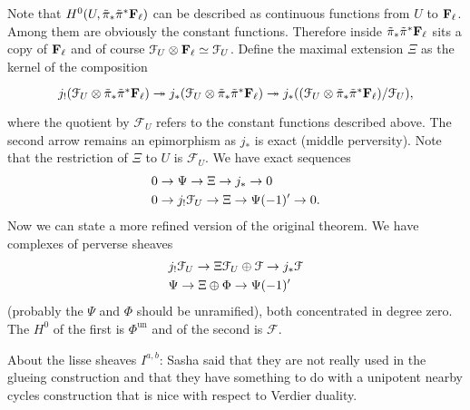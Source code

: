 \documentclass[deligne.tex]{subfiles}
\begin{document}
Note that $H^0(U,\tilde\pi_*\tilde\pi^*\mathbf{F}_\ell)$ can be described as
continuous functions from $U$ to $\mathbf{F}_\ell$. Among them are obviously the
constant functions. Therefore inside $\tilde\pi_*\tilde\pi^*\mathbf{F}_\ell$
sits a copy of $\mathbf{F}_\ell$ and of course
$\mathcal F_U\otimes\mathbf{F}_\ell\simeq\mathcal F_U$.
Define the maximal extension $\Xi$ as the kernel of the composition
\begin{equation*}\begin{tikzcd}
	j_!(\mathcal F_U\otimes\tilde\pi_*\tilde\pi^*\FF_\ell)\twoheadrightarrow
	j_*(\mathcal F_U\otimes\tilde\pi_*\tilde\pi^*\FF_\ell)\twoheadrightarrow
	j_*((\mathcal F_U\otimes\tilde\pi_*\tilde\pi^*\FF_\ell)/\mathcal F_U),
\end{tikzcd}\end{equation*}
where the quotient by $\mathcal F_U$ refers to the constant functions
described above. The second arrow remains an epimorphism as $j_*$ is exact
(middle perversity). Note that the restriction of $\Xi$ to $U$ is
$\mathcal F_U$. We have exact sequences
\begin{align*}
	&0\rightarrow\Psi\rightarrow\Xi\rightarrow j_*\rightarrow0 \\
	&0\rightarrow j_!\mathcal F_U\rightarrow\Xi\rightarrow\Psi(-1)'\rightarrow0.
\end{align*}
Now we can state a more refined version of the original theorem.
We have complexes of perverse sheaves
\begin{align*}
	&j_!\mathcal F_U\rightarrow\Xi\mathcal F_U\oplus\mathcal F\rightarrow j_*\mathcal F \\
	&\Psi\rightarrow\Xi\oplus\Phi\rightarrow\Psi(-1)'
\end{align*}
(probably the $\Psi$ and $\Phi$ should be unramified),
both concentrated in degree zero.
The $H^0$ of the first is $\Phi^{\mathrm{un}}$ and of the second is
$\mathcal F$.

\begin{remark}
	About the lisse sheaves $I^{a,b}$: Sasha said that they are not really
	used in the glueing construction and that they have something to do with
	a unipotent nearby cycles construction that is nice with respect to 
	Verdier duality.
\end{remark}
\end{document}
